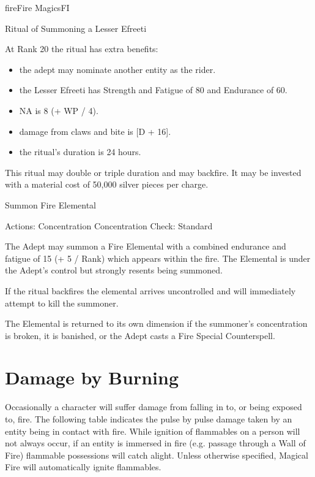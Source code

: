 \begin{College}[2.0]{fire}{Fire Magics}{FI}
\begin{ritual}[R-3]{Ritual of Summoning a Lesser Efreeti}
\begin{effects}
At Rank 20 the ritual has extra benefits:  

\begin{itemize}
\item the adept may nominate another entity as the rider.

\item the Lesser Efreeti has Strength and Fatigue of 80 and Endurance
  of 60.

\item NA is 8 (+ WP / 4).

\item damage from claws and bite is [D + 16].  

\item the ritual’s duration is 24 hours. 
\end{itemize}

This ritual may double or triple duration and may backfire. It may be
invested with a material cost of 50,000 silver pieces per charge.
\end{effects}
\end{ritual}

\begin{ritual}[R-4]{Summon Fire Elemental}

Actions: Concentration 
Concentration Check: Standard 
\begin{effects}
The Adept may summon a Fire Elemental with a combined endurance and
fatigue of 15 (+ 5 / Rank) which appears within the fire.  The
Elemental is under the Adept’s control but strongly resents being
summoned.

If the ritual backfires the elemental arrives uncontrolled and will
immediately attempt to kill the summoner.

The Elemental is returned to its own dimension if the summoner’s
concentration is broken, it is banished, or the Adept casts a Fire
Special Counterspell.
\end{effects}
\end{ritual}

\raggedcolumns
\columnbreak

\section{Damage by Burning}

Occasionally a character will suffer damage from falling in to, or
being exposed to, fire. The following table indicates the pulse by
pulse damage taken by an entity being in contact with fire. While
ignition of flammables on a person will not always occur, if an entity
is immersed in fire (e.g. passage through a Wall of Fire) flammable
possessions will catch alight.  Unless otherwise specified, Magical
Fire will automatically ignite flammables.


\end{College}
